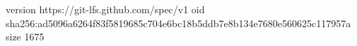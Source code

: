 version https://git-lfs.github.com/spec/v1
oid sha256:ad5096a6264f83f5819685c704e6bc18b5ddb7e8b134e7680e560625c117957a
size 1675

